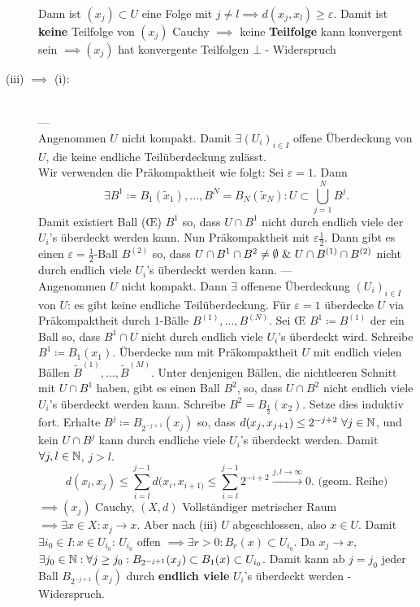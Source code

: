 \begin{subproof*}
\begin{description}
			Dann ist $ (x_j) \subset U $ eine Folge mit $ j \neq l \implies d(x_j, x_l) \geq \varepsilon  $.
			Damit ist \textbf{keine} Teilfolge von $ (x_j) $ Cauchy $ \implies  $ keine \textbf{Teilfolge} kann konvergent sein $ \implies (x_j) $ hat konvergente Teilfolgen $\bot $ - Widerspruch
		\item[(iii) $ \implies  $ (i):]~\\
			---~\\
			Angenommen $ U $ nicht kompakt. Damit $ \exists (U_i)_{i \in I}  $ offene Überdeckung von $ U $, die keine endliche Teilüberdeckung zulässt.\\
			Wir verwenden die Präkompaktheit wie folgt: Sei $ \varepsilon = 1 $.
			Dann 
			\[
				\exists B^1 \coloneqq B_1 (\tilde x_1), \dotsc, B^N = B_N (\tilde x_N) : U \subset \bigcup_{j=1} ^N B^j.
			\]
			Damit existiert Ball (\OE) $ B^1 $ so, dass $ U \cap B^1 $ nicht durch endlich viele der $ U_i $'s überdeckt werden kann.
			Nun Präkompaktheit mit $ \varepsilon \frac{ 1 }{ 2 }  $.
			Dann gibt es einen $ \varepsilon = \frac{ 1 }{ 2 }  $-Ball $ B^{(2)}  $ so, dass $ U \cap B^1 \cap B^2 \neq \emptyset ~\&~ U \cap B^{(1)} \cap B^{(2)}  $ nicht durch endlich viele $ U_i $'s überdeckt werden kann.
			---~\\
			Angenommen $ U $ nicht kompakt.
			Dann $ \exists  $ offenene Überdeckung $ (U_i)_{i \in I}  $ von $ U $:
			es gibt keine endliche Teilüberdeckung.
			Für $ \varepsilon = 1 $ überdecke $ U $ via Präkompaktheit durch $ 1 $-Bälle $ B^{(1)} , \dotsc, B^{(N)}  $.
			Sei \OE{} $ B^1 \coloneqq B^{(1)}  $ der ein Ball so, dass $ B^1 \cap U $ nicht durch endlich viele $ U_i $'s überdeckt wird.
			Schreibe $ B^1 \coloneqq B_1 (x_1) $. Überdecke nun mit Präkompaktheit $ U $ mit endlich vielen Bällen $ \tilde{B}^{(1)} , \dotsc, \tilde{B}^{(M)}  $.
			Unter denjenigen Bällen, die nichtleeren Schnitt mit $ U \cap B^1 $ haben, gibt es einen Ball $ B^2 $, so, dass $ U\cap B^2 $ nicht endlich viele $ U_i $'s überdeckt werden kann.
			Schreibe $ B^2 = B_{\frac{ 1 }{ 2 }} (x_2) $.
			Setze dies induktiv fort.
			Erhalte $ B^{j} \coloneqq B_{2^{-j + 1} } (x_j) $ so, dass $ d(x_j, x_{j + 1} )\leq 2^{-j + 2} ~ \forall j \in \mathbb{N}  $, und kein $ U\cap B^j $ kann durch endliche viele $ U_i $'s überdeckt werden.
			Damit $ \forall j , l \in \mathbb{N}  $, $ j> l $.
			\[
				d(x_l, x_j) \leq \sum_{i=l}^{j - 1} d(x_i, x_{i+1)} \leq \sum_{i=l}^{j - 1} 2^{-i + 2} \overset{j, l \to \infty}{\longrightarrow} 0. \text{ (geom. Reihe)} 
			\]
			$ \implies (x_j) $ Cauchy, $ (X, d) $ Vollständiger metrischer Raum $ \implies \exists x \in X : x_j \to x $. Aber nach (iii) $ U $ abgeschlossen, also $ x \in U $.
			Damit $ \exists i_0 \in I : x \in U_{i_0}  $: $ U_{i_0} $ offen $ \implies \exists r > 0 : B_{r}(x) \subset U_{i_0}  $.
			Da $ x_j \to x $, $ \exists j_0 \in \mathbb{N} : \forall j \geq j_{0} : B_{2^{-j + 1} }(x_j) \subset B_{1}(x) \subset U_{i_0}  $.
			Damit kann ab $ j = j_0 $ jeder Ball $ B_{2^{-j + 1} }(x_j)  $ durch \textbf{endlich viele} $ U_i $'s überdeckt werden - Widerspruch.
	\end{description}
\end{subproof*}

